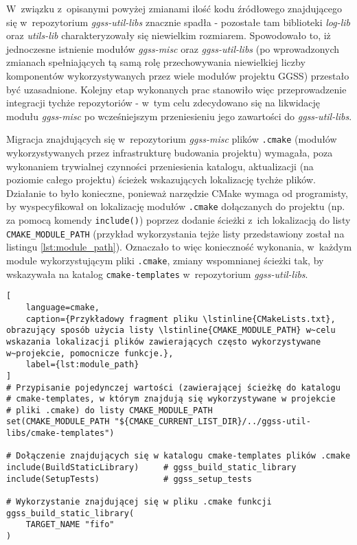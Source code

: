W~związku z~opisanymi powyżej zmianami ilość kodu źródłowego znajdującego się w~repozytorium \emph{ggss-util-libs} znacznie spadła - pozostałe tam biblioteki \emph{log-lib} oraz \emph{utils-lib} charakteryzowały się niewielkim rozmiarem. Spowodowało to, iż jednoczesne istnienie modułów \emph{ggss-misc} oraz \emph{ggss-util-libs} (po wprowadzonych zmianach spełniających tą samą rolę przechowywania niewielkiej liczby komponentów wykorzystywanych przez wiele modułów projektu GGSS) przestało być uzasadnione. Kolejny etap wykonanych prac stanowiło więc przeprowadzenie integracji tychże repozytoriów - w~tym celu zdecydowano się na likwidację modułu \emph{ggss-misc} po wcześniejszym przeniesieniu jego zawartości do \emph{ggss-util-libs}.

Migracja znajdujących się w~repozytorium \emph{ggss-misc} plików \lstinline{.cmake} (modułów wykorzystywanych przez infrastrukturę budowania projektu) wymagała, poza wykonaniem trywialnej czynności przeniesienia katalogu, aktualizacji (na poziomie całego projektu) ścieżek wskazujących lokalizację tychże plików. Działanie to było konieczne, ponieważ narzędzie CMake wymaga od programisty, by wyspecyfikował on lokalizację modułów \lstinline{.cmake} dołączanych do projektu (np. za pomocą komendy \lstinline{include()}) poprzez dodanie ścieżki z~ich lokalizacją do listy \lstinline{CMAKE_MODULE_PATH} (przykład wykorzystania tejże listy przedstawiony został na listingu \ref{lst:module_path}). Oznaczało to więc konieczność wykonania, w~każdym module wykorzystującym pliki \lstinline{.cmake}, zmiany wspomnianej ścieżki tak, by wskazywała na katalog \lstinline{cmake-templates} w~repozytorium \emph{ggss-util-libs}.

\begin{lstlisting}[
    language=cmake,
    caption={Przykładowy fragment pliku \lstinline{CMakeLists.txt}, obrazujący sposób użycia listy \lstinline{CMAKE_MODULE_PATH} w~celu wskazania lokalizacji plików zawierających często wykorzystywane w~projekcie, pomocnicze funkcje.},
    label={lst:module_path}
]
# Przypisanie pojedynczej wartości (zawierającej ścieżkę do katalogu
# cmake-templates, w którym znajdują się wykorzystywane w projekcie
# pliki .cmake) do listy CMAKE_MODULE_PATH
set(CMAKE_MODULE_PATH "${CMAKE_CURRENT_LIST_DIR}/../ggss-util-libs/cmake-templates")

# Dołączenie znajdujących się w katalogu cmake-templates plików .cmake
include(BuildStaticLibrary)     # ggss_build_static_library
include(SetupTests)             # ggss_setup_tests

# Wykorzystanie znajdującej się w pliku .cmake funkcji
ggss_build_static_library(
    TARGET_NAME "fifo"
)
\end{lstlisting}


